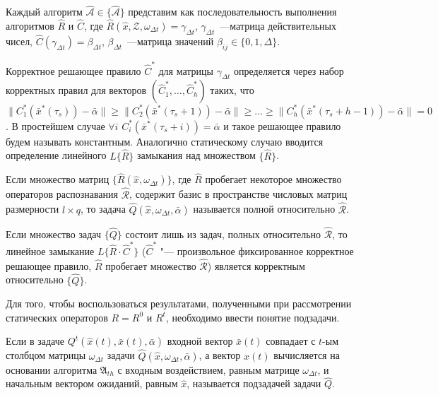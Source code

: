 \begin{Pred}
	\label{st:decompositon_dyn}
	Каждый алгоритм $\hat{\mathcal{A}}\in\{\hat{\mathcal{A}}\}$ представим как последовательность выполнения алгоритмов $\hat{R}$ и $\hat{C}$, где $\hat{R}(\hat{x}, \mathcal{Z}, \omega_{\Delta{t}})=\gamma_{\Delta{t}}$, $\gamma_{\Delta{t}}$~---матрица действительных чисел, $\hat{C}(\gamma_{\Delta{t}})=\beta_{\Delta{t}}$, $\beta_{\Delta{t}}$~---матрица значений $\beta_{ij}\in\{0,1,\Delta\}$.
\end{Pred}

Корректное решающее правило $\hat{C}^*$ для матрицы $\gamma_{\Delta{t}}$ определяется через набор корректных правил для векторов $(
\hat{C}_1^*, \dots, \hat{C}_h^*)$ таких, что $\|C_1^*(\bar{x}^*(\tau_s))-\bar{\alpha}\|\geqslant\|C_2^*(\bar{x}^*(\tau_s+1))-\bar{\alpha}\|\geqslant\dots\geqslant\|C_h^*(\bar{x}^*(\tau_s+h-1))-\bar{\alpha}\|=0$. В простейшем случае $\forall{i}$ $C_i^*(\bar{x}^*(\tau_s+i))=\bar{\alpha}$ и такое решающее правило будем называть константным. Аналогично статическому случаю вводится определение линейного $L\{\hat{R}\}$ замыкания над множеством $\{\hat{R}\}$. 

\begin{Def}
	Если множество матриц $\{\hat R(\hat x,\omega_{\Delta t})\}$, где $\hat R$ пробегает некоторое множество операторов распознавания $\hat{\mathcal R}$, содержит базис в пространстве числовых матриц размерности $l\times q$, то задача $\hat Q(\hat x,\omega_{\Delta t},\bar{\alpha})$ называется полной относительно $\hat{\mathcal R}$.
\end{Def}

\begin{Pred}
	\label{pred:correctness_d}
	Если множество задач $\{\hat Q\}$ состоит лишь из задач, полных относительно $\hat{\mathcal R}$, то линейное замыкание $L\{\hat R{\cdot}\hat C^*\}$ ($\hat C^*$ "--- произвольное фиксированное корректное решающее правило, $\hat R$ пробегает множество $\hat{\mathcal R}$) является корректным относительно $\{\hat Q\}$.
\end{Pred}
	
Для того, чтобы воспользоваться результатами, полученными при рассмотрении статических операторов $R=R^0$ и $R^t$, необходимо ввести понятие подзадачи.

\begin{Def}
	Если в задаче $Q^t(\hat x(t),\bar x(t),\bar\alpha)$ входной вектор $\bar x(t)$ совпадает с $t$-ым столбцом матрицы $\omega_{\Delta t}$ задачи $\hat Q(\hat x,\omega_{\Delta t},\bar\alpha)$, а вектор $\hat x(t)$ вычисляется на основании алгоритма $\mathfrak A_{th}$ с входным воздействием, равным матрице $\omega_{\Delta t}$, и начальным вектором ожиданий, равным $\hat x$, называется подзадачей задачи $\hat Q$.
\end{Def}

